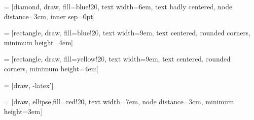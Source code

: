 \usepackage{tikz}
\usepackage{tikz-cd} %
\usepackage{makeshape} %
\usetikzlibrary{arrows.meta, calc, decorations.pathreplacing, shapes, arrows}


=
[diamond,
    draw,
    fill=blue!20,
    text
    width=6em,
    text
    badly
    centered,
    node
    distance=3cm,
    inner
sep=0pt]

=
[rectangle,
    draw,
    fill=blue!20,
    text
    width=9em,
    text
    centered,
    rounded
    corners,
    minimum
height=4em]

=
[rectangle,
    draw,
    fill=yellow!20,
    text
    width=9em,
    text
    centered,
    rounded
    corners,
    minimum
height=4em]

=
[draw,
-latex']

=
[draw,
    ellipse,fill=red!20,
    text
    width=7em,
    node
    distance=3cm,
    minimum
height=3em]
